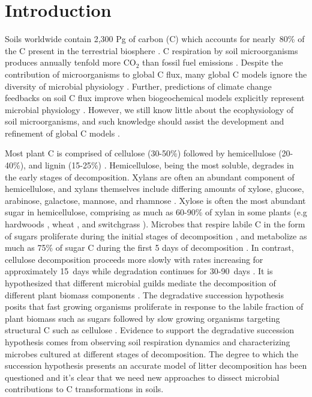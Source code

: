 \section{Introduction}
Soils worldwide contain 2,300 Pg of carbon (C) which accounts for nearly~80\%
of the C present in the terrestrial biosphere
\citep{Amundson_2001,BATJES_1996}. C respiration by soil microorganisms
produces annually tenfold more CO$_{2}$ than fossil fuel emissions
\citep{chapin2002principles}. Despite the contribution of microorganisms to
global C flux, many global C models ignore the diversity of microbial
physiology \citep{Allison2010,Six2006,Treseder2011}. Further, predictions of climate
change feedbacks on soil C flux improve when biogeochemical models explicitly
represent microbial physiology \citep{Wieder2013}. However, we still know
little about the ecophysiology of soil microorganisms, and such knowledge
should assist the development and refinement of global C models
\citep{Bradford2008,Neff_2001,McGuire2010}.

Most plant C is comprised of cellulose (30-50\%) followed by hemicellulose
(20-40\%), and lignin (15-25\%) \citep{Lynd2002}. Hemicellulose, being the most
soluble, degrades in the early stages of decomposition. Xylans are often an
abundant component of hemicellulose, and xylans themselves include differing
amounts of xylose, glucose, arabinose, galactose, mannose, and rhamnose
\citep{Saha2003}. Xylose is often the most abundant sugar in hemicellulose,
comprising as much as 60-90\% of xylan in some plants (e.g hardwoods
\citep{Spiridon2008}, wheat \citep{Sun2005}, and switchgrass
\citep{Bunnell2013}). Microbes that respire labile C in the form of sugars
proliferate during the initial stages of decomposition
\citep{Garrett1951,Alexander1964}, and metabolize as much as 75\% of sugar
C during the first 5 days of decomposition \citep{Engelking2007}. In contrast,
cellulose decomposition proceeds more slowly with rates increasing for
approximately 15~days while degradation continues for 30-90~days
\citep{Hu1997,Engelking2007}. It is hypothesized that different microbial
guilds mediate the decomposition of different plant biomass components
\citep{Hu1997,Rui2009,AnneliseHKjoller2002,Bastian_2009}. The degradative
succession hypothesis posits that fast growing organisms proliferate in
response to the labile fraction of plant biomass such as sugars
\citep{Garrett1963,Bremer1994} followed by slow growing organisms targeting
structural C such as cellulose \citep{Garrett1963}. Evidence to support the
degradative succession hypothesis comes from observing soil respiration
dynamics and characterizing microbes cultured at different stages of
decomposition. The degree to which the succession hypothesis presents an
accurate model of litter decomposition has been questioned
\citep{AnneliseHKjoller2002,Frankland_1998,Osono_2005} and it's clear that we
need new approaches to dissect microbial contributions to C transformations in
soils.

